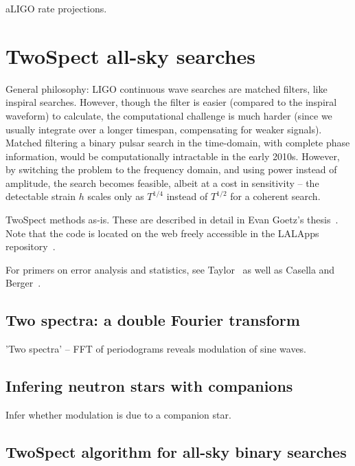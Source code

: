                 aLIGO rate projections.

        \section{TwoSpect all-sky searches}
        \label{all-sky}

        General philosophy: LIGO continuous wave searches are matched filters, like inspiral searches. However, though the filter is easier (compared to the inspiral waveform) to calculate, the computational challenge is much harder (since we usually integrate over a longer timespan, compensating for weaker signals). Matched filtering a binary pulsar search in the time-domain, with complete phase information, would be computationally intractable in the early 2010s. However, by switching the problem to the frequency domain, and using power instead of amplitude, the search becomes feasible, albeit at a cost in sensitivity -- the detectable strain $h$ scales only as $T^{1/4}$ instead of $T^{1/2}$ for a coherent search.

            TwoSpect methods as-is. These are described in detail in Evan Goetz's thesis~\cite{GoetzThesis}. Note that the code is located on the web freely accessible in the LALApps repository~\cite{LALAPPSrepo}.

For primers on error analysis and statistics, see Taylor~\cite{taylor} as well as Casella and Berger~\cite{CasellaBerger2001}.

            \subsection{Two spectra: a double Fourier transform}
            \label{two_spectra}

                'Two spectra' -- FFT of periodograms reveals modulation of sine waves.

            \subsection{Infering neutron stars with companions}
            \label{inference}
 
                Infer whether modulation is due to a companion star.



\subsection{TwoSpect algorithm for all-sky binary searches}


